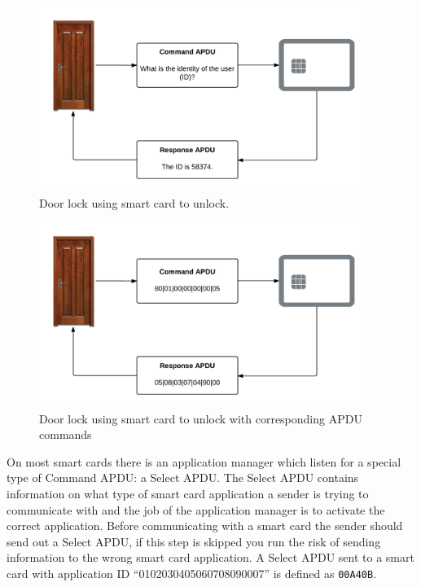 \begin{figure}[h!]
  \caption{Door lock using smart card to unlock.}
  \label{fig:doornfc}
  \centering
    \includegraphics[width=0.95\textwidth]{images/doornfc.png}
\end{figure}


\begin{figure}[h!]
  \caption{Door lock using smart card to unlock with corresponding APDU commands}
  \label{fig:doornfcapdu}
  \centering
    \includegraphics[width=0.95\textwidth]{images/doornfc_apdu.png}
\end{figure}

On most smart cards there is an application manager which listen for a special type of Command APDU: a Select APDU. The Select APDU contains information on what type of smart card application a sender is trying to communicate with and the job of the application manager is to activate the correct application. Before communicating with a smart card the sender should send out a Select APDU, if this step is skipped you run the risk of sending information to the wrong smart card application. A Select APDU sent to a smart card with application ID ``0102030405060708090007'' is defined as \texttt{00\textbar A4\textbar0B}.

